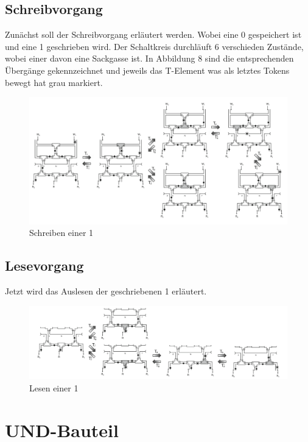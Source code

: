 \documentclass[11pt,a4paper]{article}
\begin{document}
\subsection{Schreibvorgang}
Zunächst soll der Schreibvorgang erläutert werden.
%
Wobei eine 0 gespeichert ist und eine 1 geschrieben wird.
%
Der Schaltkreis durchläuft 6 verschieden Zustände, wobei einer 
davon eine Sackgasse ist.
%
In Abbildung 8 sind die entsprechenden Übergänge gekennzeichnet 
und jeweils das T-Element was als letztes Tokens bewegt hat grau markiert.

\begin{figure}[h]
      \includegraphics[width=14cm]{bilder/write1Mem.png} 
      \caption{Schreiben einer 1}
\end{figure}

\subsection{Lesevorgang}
Jetzt wird das Auslesen der geschriebenen 1 erläutert.

\begin{figure}[h]
      \includegraphics[width=14cm]{bilder/read1Mem.png} 
      \caption{Lesen einer 1}
\end{figure}



\section{UND-Bauteil}
\end{document}
